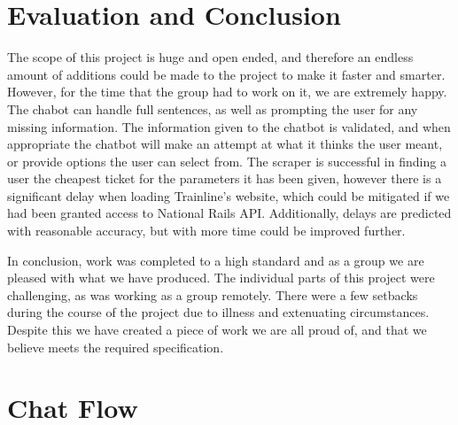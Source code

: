 \documentclass[11pt]{article}
\begin{document}
	\section{Evaluation and Conclusion}\label {Evaluation}
	The scope of this project is huge and open ended, and therefore an endless amount of additions could be made to the project to make it faster and smarter. However, for the time that the group had to work on it, we are extremely happy. The chabot can handle full sentences, as well as prompting the user for any missing information. The information given to the chatbot is validated, and when appropriate the chatbot will make an attempt at what it thinks the user meant, or provide options the user can select from. The scraper is successful in finding a user the cheapest ticket for the parameters it has been given, however there is a significant delay when loading Trainline’s website, which could be mitigated if we had been granted access to National Rails API. Additionally, delays are predicted with reasonable accuracy, but with more time could be improved further. 
	
	
	In conclusion, work was completed to a high standard and as a group we are pleased with what we have produced. The individual parts of this project were challenging, as was working as a group remotely. There were a few setbacks during the course of the project due to illness and extenuating circumstances. Despite this we have created a piece of work we are all proud of, and that we believe meets the required specification. 
	
	
	
	 
	\clearpage
	\appendix
	
	\section{Chat Flow} \label{appendix:ChatFlow}	
		
	
\end{document}

